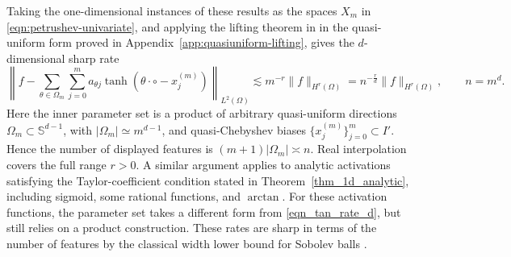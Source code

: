 \documentclass{article}
\numberwithin{equation}{section}
\def\SS{\mathbb{S}}
\def\lt{\left}
\def\rt{\right}
\begin{document}
Taking the one-dimensional instances of these results as the spaces $X_m$ in \eqref{eqn:petrushev-univariate}, and applying the lifting theorem in \cite{petrushev1998approximation} in the quasi-uniform form proved in Appendix~\ref{app:quasiuniform-lifting}, gives the $d$-dimensional sharp rate
\begin{equation}\label{eqn_tan_rate_d}
    \lt\|f-\sum_{\theta\in\Omega_m}\sum_{j=0}^m a_{\theta j}\tanh\lt(\theta\cdot\circ-x_j^{(m)}\rt)\rt\|_{L^2(\Omega)}
    \lesssim m^{-r}\|f\|_{H^r(\Omega)}
    =n^{-\frac rd}\|f\|_{H^r(\Omega)},
    \qquad n=m^d.
\end{equation}
Here the inner parameter set is a product of arbitrary quasi-uniform directions $\Omega_m\subset\SS^{d-1}$, with $|\Omega_m|\simeq m^{d-1}$, and quasi-Chebyshev biases $\{x_j^{(m)}\}_{j=0}^{m}\subset I'$. Hence the number of displayed features is $(m+1)|\Omega_m|\asymp n$. Real interpolation covers the full range $r>0$. A similar argument applies to analytic activations satisfying the Taylor-coefficient condition stated in Theorem~\ref{thm_1d_analytic}, including sigmoid, some rational functions, and $\arctan$. For these activation functions, the parameter set takes a different form from \eqref{eqn_tan_rate_d}, but still relies on a product construction. These rates are sharp in terms of the number of features by the classical width lower bound for Sobolev balls \cite{devore1989optimal}.

\end{document}
